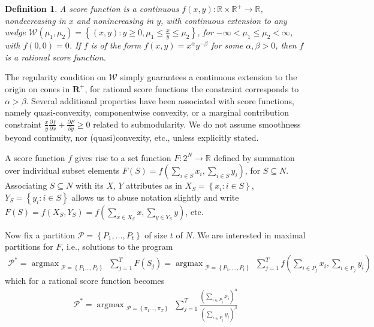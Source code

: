 \documentclass{article}
\newtheorem{definition}{Definition}
\theoremstyle{case}
\DeclareMathOperator*{\argmax}{argmax} %
\begin{document}
\begin{definition}
A score function is a continuous $f(x, y)\colon \mathbb{R} \times \mathbb{R}^{+} \to \mathbb{R}$, nondecreasing in $x$ and nonincreasing in $y$, with continuous extension to any wedge $\mathcal{W}\left(\mu_1,\mu_2\right) = \left\lbrace (x,y) : y \geq 0, \mu_1 \leq \frac{x}{y} \leq \mu_2 \right\rbrace$, for $-\infty < \mu_1 \leq \mu_2 < \infty$, with $f(0,0) = 0$. If $f$ is of the form $f(x,y) = x^\alpha y^{-\beta}$ for some $\alpha, \beta > 0$, then $f$ is a rational score function. 
\end{definition}

The regularity condition on $\mathcal{W}$ simply guarantees a continuous extension to the origin on cones in $\mathbf{R}^+$, for rational score functions the constraint corresponds to $\alpha > \beta$. Several additional properties have been associated with score functions, namely quasi-convexity, componentwise convexity, or a marginal contribution constraint $\frac{x}{y} \frac{\partial f}{\partial x} + \frac{\partial F}{\partial y} \geq 0$ related to submodularity. We do not assume smoothness beyond continuity, nor (quasi)convexity, etc., unless explicitly stated.

A score function $f$ gives rise to a set function $F \colon 2^N \rightarrow \mathbb{R}$ defined by summation over individual subset elements $F(S) = f(\sum_{i \in S} x_i, \sum_{i \in S} y_i)$, for $S \subseteq N$. Associating $S \subseteq N$ with its $X$, $Y$ attributes as in $X_S = \left\lbrace x_i \colon i \in S\right\rbrace$, $Y_S = \left\lbrace y_i \colon i \in S\right\rbrace$ allows us to abuse notation slightly and write $F(S) = f(X_S, Y_S) = f(\sum_{x \in X_S}x, \sum_{y \in Y_S}y)$, etc.

Now fix a partition $\mathcal{P} = \left\lbrace P_1, \dots, P_t\right\rbrace$ of size $t$ of $N$. We are interested in maximal partitions for $F$, i.e., solutions to the program
\begin{align} \label{eq0}
\mathcal{P}^{*} = \argmax_{\substack{\mathcal{P} = \left\lbrace P_1 \dots, P_t\right\rbrace}} {\sum\limits_{j=1}^{T}F\left(S_j\right)} = \argmax_{\substack{\mathcal{P} = \left\lbrace P_1, \dots, P_t\right\rbrace}} {\sum\limits_{j=1}^{T}f( \sum_{i \in P_j}x_i, \sum_{i \in P_j}y_i)}
\end{align}
which for a rational score function becomes
\begin{align} \label{eq1}
\mathcal{P}^{*} = \argmax_{\substack{\mathcal{P} = \left\lbrace \pi_1 \dots, \pi_T\right\rbrace}}\sum_{j=1}^{T}\frac{(\sum_{i \in P_j}x_i)^\alpha}{(\sum_{i \in P_j}y_i)^\beta}
\end{align}
\end{document}

